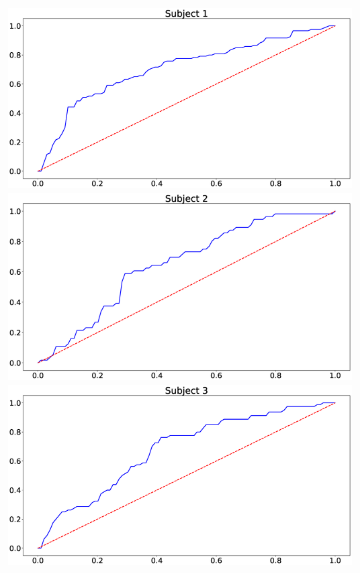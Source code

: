 \documentclass[journal]{IEEEtran}
\begin{document}
{{\begin{figure}[h!]
\captionsetup[subfigure]{justification=centering}
\begin{subfigure}{0.5\textwidth}
\centering
\includegraphics[scale=0.09]{revisedimages/roc_1.eps}   \hspace{-1.5em}
\includegraphics[scale=0.09]{revisedimages/roc_2.eps} \\
\centering
\includegraphics[scale=0.09]{revisedimages/roc_3.eps}   \hspace{-1.5em}

\end{subfigure}
\end{figure}}}
\end{document}
